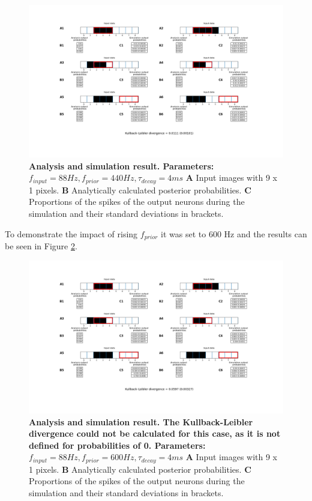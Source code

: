 \begin{figure}
  \includegraphics[width=\linewidth]{figures/1D/1D_88_440_4.png}
  \caption{\textbf{Analysis and simulation result. Parameters: } $f_{input} = 88 Hz, f_{prior} = 440 Hz, \tau_{decay} = 4 ms$ \textbf{A} Input images with 9 x 1 pixels. \textbf{B} Analytically calculated posterior probabilities. \textbf{C} Proportions of the spikes of the output neurons during the simulation and their standard deviations in brackets.}
  \label{fig:1D_88_440_4}
\end{figure}

To demonstrate the impact of rising $f_{prior}$ it was set to 600 Hz and the results can be seen in Figure \ref{fig:1D_88_600_4}.

\begin{figure}
  \includegraphics[width=\linewidth]{figures/1D/1D_88_600_4.png}
  \caption{\textbf{Analysis and simulation result. The Kullback-Leibler divergence could not be calculated for this case, as it is not defined for probabilities of 0. Parameters: } $f_{input} = 88 Hz, f_{prior} = 600 Hz, \tau_{decay} = 4 ms$ \textbf{A} Input images with 9 x 1 pixels. \textbf{B} Analytically calculated posterior probabilities. \textbf{C} Proportions of the spikes of the output neurons during the simulation and their standard deviations in brackets.}
  \label{fig:1D_88_600_4}
\end{figure}

